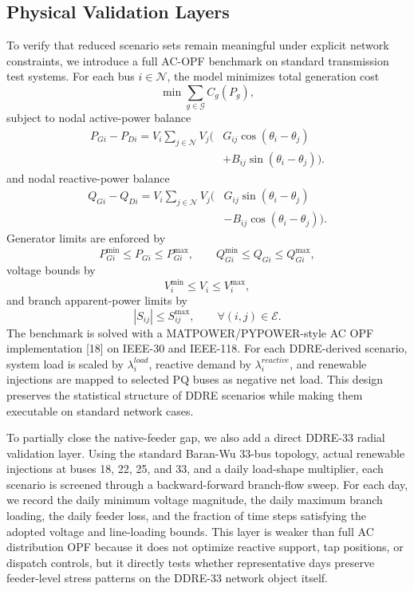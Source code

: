 \documentclass[journal]{IEEEtran}
\begin{document}
\subsection{Physical Validation Layers}
To verify that reduced scenario sets remain meaningful under explicit network constraints, we introduce a full AC-OPF benchmark on standard transmission test systems. For each bus $i\in\mathcal{N}$, the model minimizes total generation cost
\begin{equation}
\min \sum_{g\in\mathcal{G}} C_g(P_g),
\end{equation}
subject to nodal active-power balance
\begin{equation}
\begin{aligned}
P_{Gi}-P_{Di}=V_i\sum_{j\in\mathcal{N}} V_j(&G_{ij}\cos(\theta_i-\theta_j) \\
& +B_{ij}\sin(\theta_i-\theta_j)).
\end{aligned}
\end{equation}
and nodal reactive-power balance
\begin{equation}
\begin{aligned}
Q_{Gi}-Q_{Di}=V_i\sum_{j\in\mathcal{N}} V_j(&G_{ij}\sin(\theta_i-\theta_j) \\
& -B_{ij}\cos(\theta_i-\theta_j)).
\end{aligned}
\end{equation}
Generator limits are enforced by
\begin{equation}
P_{Gi}^{\min}\le P_{Gi}\le P_{Gi}^{\max},\qquad
Q_{Gi}^{\min}\le Q_{Gi}\le Q_{Gi}^{\max},
\end{equation}
voltage bounds by
\begin{equation}
V_i^{\min}\le V_i\le V_i^{\max},
\end{equation}
and branch apparent-power limits by
\begin{equation}
|S_{ij}|\le S_{ij}^{\max},\qquad \forall (i,j)\in\mathcal{E}.
\end{equation}
The benchmark is solved with a MATPOWER/PYPOWER-style AC OPF implementation [18] on IEEE-30 and IEEE-118. For each DDRE-derived scenario, system load is scaled by $\lambda_i^{load}$, reactive demand by $\lambda_i^{reactive}$, and renewable injections are mapped to selected PQ buses as negative net load. This design preserves the statistical structure of DDRE scenarios while making them executable on standard network cases.

To partially close the native-feeder gap, we also add a direct DDRE-33 radial validation layer. Using the standard Baran-Wu 33-bus topology, actual renewable injections at buses 18, 22, 25, and 33, and a daily load-shape multiplier, each scenario is screened through a backward-forward branch-flow sweep. For each day, we record the daily minimum voltage magnitude, the daily maximum branch loading, the daily feeder loss, and the fraction of time steps satisfying the adopted voltage and line-loading bounds. This layer is weaker than full AC distribution OPF because it does not optimize reactive support, tap positions, or dispatch controls, but it directly tests whether representative days preserve feeder-level stress patterns on the DDRE-33 network object itself.
\end{document}
